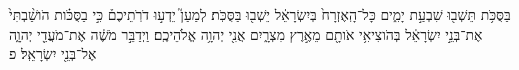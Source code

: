 \documentclass{openreader}
\begin{document}
בַּסֻּכֹּ֥ת תֵּשְׁב֖וּ שִׁבְעַ֣ת יָמִ֑ים כָּל־הָֽאֶזְרָח֙ בְּיִשְׂרָאֵ֔ל יֵשְׁב֖וּ בַּסֻּכֹּֽת׃ 
לְמַעַן֮ יֵדְע֣וּ דֹרֹֽתֵיכֶם֒ כִּ֣י בַסֻּכֹּ֗ות הֹושַׁ֨בְתִּי֙ אֶת־בְּנֵ֣י יִשְׂרָאֵ֔ל בְּהֹוצִיאִ֥י אֹותָ֖ם מֵאֶ֣רֶץ מִצְרָ֑יִם אֲנִ֖י יְהוָ֥ה אֱלֹהֵיכֶֽם׃ 
וַיְדַבֵּ֣ר מֹשֶׁ֔ה אֶת־מֹעֲדֵ֖י יְהוָ֑ה אֶל־בְּנֵ֖י יִשְׂרָאֵֽל׃ פ 
\end{document}
